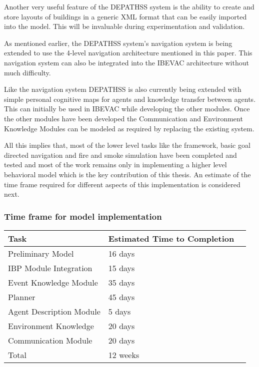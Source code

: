 Another very useful feature of the DEPATHSS system is the ability to create and store layouts of buildings in a generic XML format that can be easily imported into the model. This will be invaluable during experimentation and validation.

As mentioned earlier, the DEPATHSS system's navigation system is being extended to use the 4-level navigation architecture mentioned in this paper. This navigation system can also be integrated into the IBEVAC architecture without much difficulty. 

Like the navigation system DEPATHSS is also currently being extended with simple personal cognitive maps for agents and knowledge transfer between agents. This can initially be used in IBEVAC while developing the other modules. Once the other modules have been developed the Communication and Environment Knowledge Modules can be modeled as required by replacing the existing system.

All this implies that, most of the lower level tasks like the framework, basic goal directed navigation and fire and smoke simulation have been completed and tested and most of the work remains only in implementing a higher level behavioral model which is the key contribution of this thesis. An estimate of the time frame required for different aspects of this implementation is considered next.

\subsubsection{Time frame for model implementation}
\label{CFW:TimeFrame}

\begin{table}[tbp]
\centering
{} %
\begin{tabular}{p{2.5in}   p{1.25in}   p{1.25in}} %
\hline\hline %
Task & Estimated Time to Completion \\
\hline
Preliminary Model  & 16 days \\[3pt]
IBP Module Integration  & 15 days \\[3pt]
Event Knowledge Module    & 35 days \\[3pt]
Planner   				& 45 days \\[3pt]
Agent Description Module  & 5 days \\[3pt]
Environment Knowledge     & 20 days \\[3pt]
Communication Module 	& 20 days \\[3pt]
\hline
Total & 12 weeks \\[3pt]
\bottomrule
\end{tabular}
\label{tab:Implementation}
\end{table}

